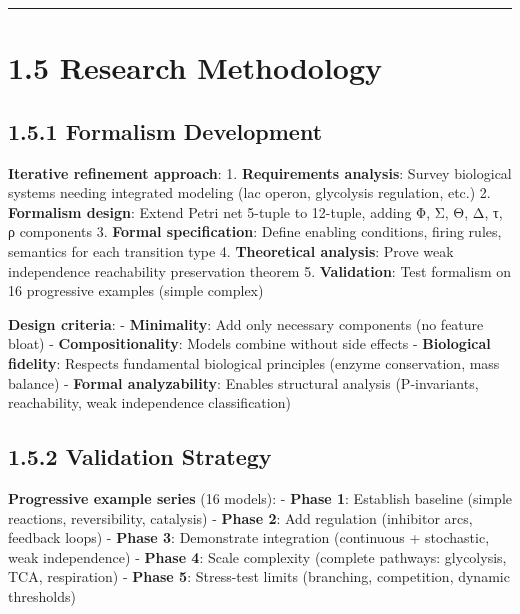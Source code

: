 \begin{center}\rule{0.5\linewidth}{0.5pt}\end{center}

\hypertarget{research-methodology}{%
\section{1.5 Research Methodology}\label{research-methodology}}

\hypertarget{formalism-development}{%
\subsection{1.5.1 Formalism Development}\label{formalism-development}}

\textbf{Iterative refinement approach}: 1. \textbf{Requirements
analysis}: Survey biological systems needing integrated modeling (lac
operon, glycolysis regulation, etc.) 2. \textbf{Formalism design}:
Extend Petri net 5-tuple to 12-tuple, adding Φ, Σ, Θ, Δ, τ, ρ components
3. \textbf{Formal specification}: Define enabling conditions, firing
rules, semantics for each transition type 4. \textbf{Theoretical
analysis}: Prove weak independence reachability preservation theorem 5.
\textbf{Validation}: Test formalism on 16 progressive examples (simple \textrightarrow
complex)

\textbf{Design criteria}: - \textbf{Minimality}: Add only necessary
components (no feature bloat) - \textbf{Compositionality}: Models
combine without side effects - \textbf{Biological fidelity}: Respects
fundamental biological principles (enzyme conservation, mass balance) -
\textbf{Formal analyzability}: Enables structural analysis
(P-invariants, reachability, weak independence classification)

\hypertarget{validation-strategy}{%
\subsection{1.5.2 Validation Strategy}\label{validation-strategy}}

\textbf{Progressive example series} (16 models): - \textbf{Phase 1}:
Establish baseline (simple reactions, reversibility, catalysis) -
\textbf{Phase 2}: Add regulation (inhibitor arcs, feedback loops) -
\textbf{Phase 3}: Demonstrate integration (continuous + stochastic, weak
independence) - \textbf{Phase 4}: Scale complexity (complete pathways:
glycolysis, TCA, respiration) - \textbf{Phase 5}: Stress-test limits
(branching, competition, dynamic thresholds)

